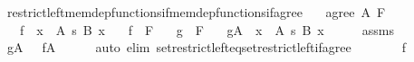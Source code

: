 \begin{isabellebody}
\isamarkupfalse%
%
\endisatagproof
{\isafoldproof}%
%
\isadelimproof
%
\endisadelimproof
%
\isadelimdocument
%
\endisadelimdocument
%
\isatagdocument
%
\isamarkuptrue%
%
\endisatagdocument
{\isafolddocument}%
%
\isadelimdocument
%
\endisadelimdocument
{}\isamarkupfalse%
\ restrict{\isacharunderscore}{\kern0pt}left{\isacharunderscore}{\kern0pt}mem{\isacharunderscore}{\kern0pt}dep{\isacharunderscore}{\kern0pt}functions{\isacharunderscore}{\kern0pt}if{\isacharunderscore}{\kern0pt}mem{\isacharunderscore}{\kern0pt}dep{\isacharunderscore}{\kern0pt}functions{\isacharunderscore}{\kern0pt}if{\isacharunderscore}{\kern0pt}agree{\isacharcolon}{\kern0pt}\isanewline
\ \ \ {\isachardoublequoteopen}agree\ A\ F{\isachardoublequoteclose}\isanewline
\ \ \ {\isachardoublequoteopen}f\ {\isasymin}\ {\isacharparenleft}{\kern0pt}x\ {\isasymin}\ A{\isacharparenright}{\kern0pt}\ {\isasymrightarrow}s\ {\isacharparenleft}{\kern0pt}B\ x{\isacharparenright}{\kern0pt}{\isachardoublequoteclose}\isanewline
\ \ \ {\isachardoublequoteopen}f\ {\isasymin}\ F{\isachardoublequoteclose}\isanewline
\ \ \ {\isachardoublequoteopen}g\ {\isasymin}\ F{\isachardoublequoteclose}\isanewline
\ \ \ {\isachardoublequoteopen}g{\isasymrestriction}\isactrlbsub A\isactrlesub \ {\isasymin}\ {\isacharparenleft}{\kern0pt}x\ {\isasymin}\ A{\isacharparenright}{\kern0pt}\ {\isasymrightarrow}s\ {\isacharparenleft}{\kern0pt}B\ x{\isacharparenright}{\kern0pt}{\isachardoublequoteclose}\isanewline
%
\isadelimproof
%
\endisadelimproof
%
\isatagproof
{}\isamarkupfalse%
\ {\isacharminus}{\kern0pt}\isanewline
\ \ \isamarkupfalse%
\ assms\ \isamarkupfalse%
\ {\isachardoublequoteopen}g{\isasymrestriction}\isactrlbsub A\isactrlesub \ \ {\isacharequal}{\kern0pt}\ f{\isasymrestriction}\isactrlbsub A\isactrlesub {\isachardoublequoteclose}\isanewline
\ \ \ \ \isamarkupfalse%
\ {\isacharparenleft}{\kern0pt}auto\ elim{\isacharcolon}{\kern0pt}\ set{\isacharunderscore}{\kern0pt}restrict{\isacharunderscore}{\kern0pt}left{\isacharunderscore}{\kern0pt}eq{\isacharunderscore}{\kern0pt}set{\isacharunderscore}{\kern0pt}restrict{\isacharunderscore}{\kern0pt}left{\isacharunderscore}{\kern0pt}if{\isacharunderscore}{\kern0pt}agree{\isacharparenright}{\kern0pt}\isanewline
\ \ \isamarkupfalse%
\ \isamarkupfalse%
\ {\isachardoublequoteopen}{\isachardot}{\kern0pt}{\isachardot}{\kern0pt}{\isachardot}{\kern0pt}\ {\isacharequal}{\kern0pt}\ f{\isachardoublequoteclose}\ \isamarkupfalse%

\end{isabellebody}
